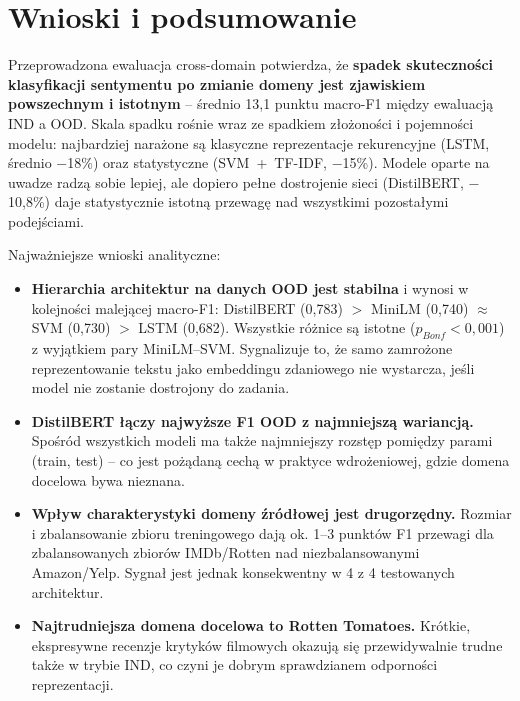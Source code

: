 \documentclass[runningheads]{llncs}
\begin{document}
\section*{Wnioski i podsumowanie}
Przeprowadzona ewaluacja cross-domain potwierdza, że \textbf{spadek skuteczności klasyfikacji sentymentu po zmianie domeny jest zjawiskiem powszechnym i istotnym} -- średnio 13{,}1 punktu macro-F1 między ewaluacją IND a OOD. Skala spadku rośnie wraz ze spadkiem złożoności i pojemności modelu: najbardziej narażone są klasyczne reprezentacje rekurencyjne (LSTM, średnio $-$18\%) oraz statystyczne (SVM~+~TF-IDF, $-$15\%). Modele oparte na uwadze radzą sobie lepiej, ale dopiero pełne dostrojenie sieci (DistilBERT, $-$10{,}8\%) daje statystycznie istotną przewagę nad wszystkimi pozostałymi podejściami.

Najważniejsze wnioski analityczne:
\begin{itemize}
    \item \textbf{Hierarchia architektur na danych OOD jest stabilna} i wynosi w kolejności malejącej macro-F1: DistilBERT (0{,}783) $>$ MiniLM (0{,}740) $\approx$ SVM (0{,}730) $>$ LSTM (0{,}682). Wszystkie różnice są istotne ($p_{Bonf}<0{,}001$) z wyjątkiem pary MiniLM--SVM. Sygnalizuje to, że samo zamrożone reprezentowanie tekstu jako embeddingu zdaniowego nie wystarcza, jeśli model nie zostanie dostrojony do zadania.
    \item \textbf{DistilBERT łączy najwyższe F1 OOD z najmniejszą wariancją.} Spośród wszystkich modeli ma także najmniejszy rozstęp pomiędzy parami (train, test) -- co jest pożądaną cechą w praktyce wdrożeniowej, gdzie domena docelowa bywa nieznana.
    \item \textbf{Wpływ charakterystyki domeny źródłowej jest drugorzędny.} Rozmiar i zbalansowanie zbioru treningowego dają ok. 1--3 punktów F1 przewagi dla zbalansowanych zbiorów IMDb/Rotten nad niezbalansowanymi Amazon/Yelp. Sygnał jest jednak konsekwentny w 4 z 4 testowanych architektur.
    \item \textbf{Najtrudniejsza domena docelowa to Rotten Tomatoes.} Krótkie, ekspresywne recenzje krytyków filmowych okazują się przewidywalnie trudne także w trybie IND, co czyni je dobrym sprawdzianem odporności reprezentacji.
\end{itemize}
\end{document}

